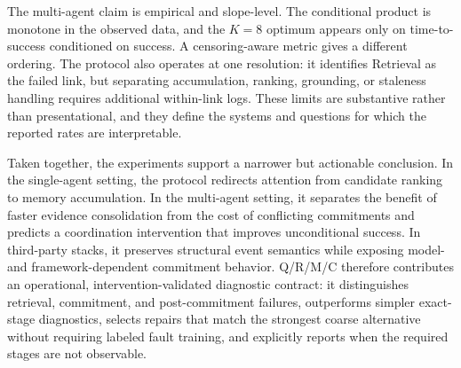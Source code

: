 \documentclass{article}
\begin{document}
The multi-agent claim is empirical and slope-level. The conditional product is monotone in the observed data, and the $K=8$ optimum appears only on time-to-success conditioned on success. A censoring-aware metric gives a different ordering. The protocol also operates at one resolution: it identifies Retrieval as the failed link, but separating accumulation, ranking, grounding, or staleness handling requires additional within-link logs. These limits are substantive rather than presentational, and they define the systems and questions for which the reported rates are interpretable.

Taken together, the experiments support a narrower but actionable conclusion. In the single-agent setting, the protocol redirects attention from candidate ranking to memory accumulation. In the multi-agent setting, it separates the benefit of faster evidence consolidation from the cost of conflicting commitments and predicts a coordination intervention that improves unconditional success. In third-party stacks, it preserves structural event semantics while exposing model- and framework-dependent commitment behavior. Q/R/M/C therefore contributes an operational, intervention-validated diagnostic contract: it distinguishes retrieval, commitment, and post-commitment failures, outperforms simpler exact-stage diagnostics, selects repairs that match the strongest coarse alternative without requiring labeled fault training, and explicitly reports when the required stages are not observable.





\end{document}
